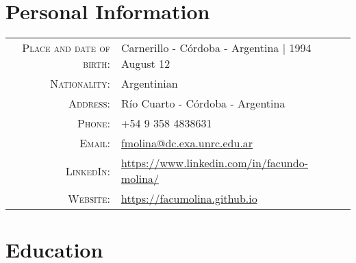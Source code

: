 \documentclass[a4paper,10pt]{article} %
\begin{document}
\pagestyle{empty} %


\par{\bigskip\par} %

\section{Personal Information}

\begin{tabular}{rl}
\\
\textsc{Place and date of birth:} & Carnerillo - Córdoba - Argentina | 1994 August 12 \\
\textsc{Nationality:} & Argentinian \\
\textsc{Address:} & Río Cuarto - Córdoba - Argentina\\
\textsc{Phone:} & +54 9 358 4838631\\
\textsc{Email:} & \href{mailto:fmolina@dc.exa.unrc.edu.ar}{fmolina@dc.exa.unrc.edu.ar} \\
\textsc{LinkedIn:} & \href{https://www.linkedin.com/in/facundo-molina/}{https://www.linkedin.com/in/facundo-molina/} \\
\textsc{Website:} & \href{https://facumolina.github.io}{https://facumolina.github.io}
\end{tabular}


\section{Education}
\end{document}
